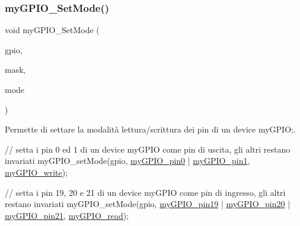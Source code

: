 \subsubsection{\texorpdfstring{my\+G\+P\+I\+O\+\_\+\+Set\+Mode()}{myGPIO\_SetMode()}}
{\footnotesize\ttfamily void my\+G\+P\+I\+O\+\_\+\+Set\+Mode (\begin{DoxyParamCaption}\item[{\hyperlink{structmy_g_p_i_o__t}{my\+G\+P\+I\+O\+\_\+t} $\ast$}]{gpio,  }\item[{\hyperlink{group__bare-metal_ga402a0d20afc0cb7c25554b8b023f4253}{my\+G\+P\+I\+O\+\_\+mask}}]{mask,  }\item[{\hyperlink{group__bare-metal_ga76b849f0e0c05e7f9161bdb33396f2b1}{my\+G\+P\+I\+O\+\_\+mode}}]{mode }\end{DoxyParamCaption})}



Permette di settare la modalità lettura/scrittura dei pin di un device my\+G\+P\+IO;. 


\begin{DoxyCode}
\textcolor{comment}{// setta i pin 0 ed 1 di un device myGPIO come pin di uscita, gli altri restano invariati}
myGPIO\_setMode(gpio, \hyperlink{group__bare-metal_gga402a0d20afc0cb7c25554b8b023f4253a6db6fa7be955ae379f543d96122e23a9}{myGPIO\_pin0} | \hyperlink{group__bare-metal_gga402a0d20afc0cb7c25554b8b023f4253a1de6bdcc01efca2c39f584f5a20293be}{myGPIO\_pin1}, 
      \hyperlink{group__bare-metal_gga76b849f0e0c05e7f9161bdb33396f2b1a2d66976280eb7595a42c631683bdfad6}{myGPIO\_write});

\textcolor{comment}{// setta i pin 19, 20 e 21 di un device myGPIO come pin di ingresso, gli altri restano invariati}
myGPIO\_setMode(gpio, \hyperlink{group__bare-metal_gga402a0d20afc0cb7c25554b8b023f4253a9118ae2775e93bd4522660e81a2d5309}{myGPIO\_pin19} | \hyperlink{group__bare-metal_gga402a0d20afc0cb7c25554b8b023f4253a7940782a16f88dbbb3a4037c2bef1711}{myGPIO\_pin20} | 
      \hyperlink{group__bare-metal_gga402a0d20afc0cb7c25554b8b023f4253a1da616a8cf4396927db1e5a336fb6dc5}{myGPIO\_pin21}, \hyperlink{group__bare-metal_gga76b849f0e0c05e7f9161bdb33396f2b1a1e6dc78e7641e878cadc842d39605d5d}{myGPIO\_read});
\end{DoxyCode}




